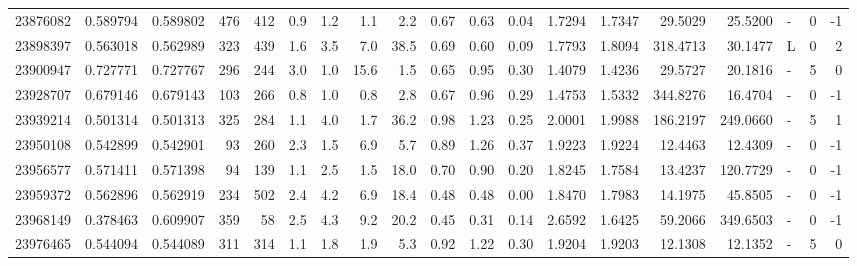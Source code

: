 \begin{tabular}{rrrrrrrrrrrrrrrrlrr}
  23876082 & 0.589794 &   0.589802 &  476 &  412 &      0.9 &      1.2 &     1.1 &      2.2 &       0.67 &        0.63 &        0.04 &  1.7294 &  1.7347 &   29.5029 &   25.5200 &             - &        0 &         -1 \\
  23898397 & 0.563018 &   0.562989 &  323 &  439 &      1.6 &      3.5 &     7.0 &     38.5 &       0.69 &        0.60 &        0.09 &  1.7793 &  1.8094 &  318.4713 &   30.1477 &             L &        0 &          2 \\
  23900947 & 0.727771 &   0.727767 &  296 &  244 &      3.0 &      1.0 &    15.6 &      1.5 &       0.65 &        0.95 &        0.30 &  1.4079 &  1.4236 &   29.5727 &   20.1816 &             - &        5 &          0 \\
  23928707 & 0.679146 &   0.679143 &  103 &  266 &      0.8 &      1.0 &     0.8 &      2.8 &       0.67 &        0.96 &        0.29 &  1.4753 &  1.5332 &  344.8276 &   16.4704 &             - &        0 &         -1 \\
  23939214 & 0.501314 &   0.501313 &  325 &  284 &      1.1 &      4.0 &     1.7 &     36.2 &       0.98 &        1.23 &        0.25 &  2.0001 &  1.9988 &  186.2197 &  249.0660 &             - &        5 &          1 \\
  23950108 & 0.542899 &   0.542901 &   93 &  260 &      2.3 &      1.5 &     6.9 &      5.7 &       0.89 &        1.26 &        0.37 &  1.9223 &  1.9224 &   12.4463 &   12.4309 &             - &        0 &         -1 \\
  23956577 & 0.571411 &   0.571398 &   94 &  139 &      1.1 &      2.5 &     1.5 &     18.0 &       0.70 &        0.90 &        0.20 &  1.8245 &  1.7584 &   13.4237 &  120.7729 &             - &        0 &         -1 \\
  23959372 & 0.562896 &   0.562919 &  234 &  502 &      2.4 &      4.2 &     6.9 &     18.4 &       0.48 &        0.48 &        0.00 &  1.8470 &  1.7983 &   14.1975 &   45.8505 &             - &        0 &         -1 \\
  23968149 & 0.378463 &   0.609907 &  359 &   58 &      2.5 &      4.3 &     9.2 &     20.2 &       0.45 &        0.31 &        0.14 &  2.6592 &  1.6425 &   59.2066 &  349.6503 &             - &        0 &         -1 \\
  23976465 & 0.544094 &   0.544089 &  311 &  314 &      1.1 &      1.8 &     1.9 &      5.3 &       0.92 &        1.22 &        0.30 &  1.9204 &  1.9203 &   12.1308 &   12.1352 &             - &        5 &          0 \\

\end{tabular}

